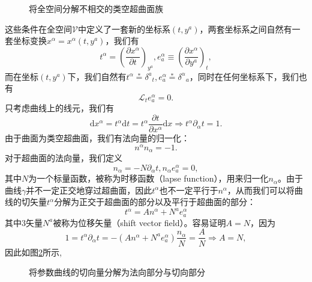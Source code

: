 \documentclass[hyperref, UTF8, a4paper]{ctexart}
\begin{document}
\begin{figure}
	\centering
	
	\caption{将全空间分解不相交的类空超曲面族}
	\label{hypersurface decompositon}
\end{figure}

这些条件在全空间$\mathscr{V}$中定义了一套新的坐标系$(t,y^{a} )$，两套坐标系之间自然有一套坐标变换$x^{\alpha } =x^{\alpha } (t,y^{a} )$，我们有
\begin{equation*}
	t^{\alpha } =\left(\frac{\partial x^{\alpha }}{\partial t}\right)_{y^{a}} ,e_{a}^{\alpha } \equiv \left(\frac{\partial x^{\alpha }}{\partial y^{a}}\right)_{t} ,
\end{equation*}
而在坐标$(t,y^{a} )$下，我们自然有$t^{\alpha }\stackrel{*}{=} \delta ^{a}{}_{t} ,e_{a}^{\alpha }\stackrel{*}{=} \delta ^{\alpha }{}_{a}$，同时在任何坐标系下，我们也有
\begin{equation*}
	\mathcal{L}_{t} e_{a}^{\alpha } =0.
\end{equation*}
只考虑曲线上的线元，我们有
\begin{equation*}
	\mathrm{d} x^{\alpha } =t^{\alpha }\mathrm{d} t=t^{\alpha }\frac{\partial t}{\partial x^{\alpha }}\mathrm{d} x\Rightarrow t^{\alpha } \partial _{\alpha } t=1.
\end{equation*}
由于曲面为类空超曲面，我们有法向量的归一化：
\begin{equation*}
	n^{\alpha } n_{\alpha } =-1.
\end{equation*}
对于超曲面的法向量，我们定义
\begin{equation*}
	n_{\alpha } =-N\partial _{\alpha } t,n_{\alpha } e_{a}^{\alpha } =0,
\end{equation*}
其中$N$为一个标量函数，被称为时移函数（lapse function），用来归一化$n_{\alpha }$。由于曲线$\gamma $并不一定正交地穿过超曲面，因此$t^{\alpha }$也不一定平行于$n^{\alpha }$，从而我们可以将曲线的切矢量$t^{\alpha }$分解为正交于超曲面的部分以及平行于超曲面的部分：
\begin{equation*}
	t^{\alpha } =An^{\alpha } +N^{a} e_{a}^{\alpha }
\end{equation*}
其中3矢量$N^{a}$被称为位移矢量（shift vector field）。容易证明$A=N$，因为
\begin{equation*}
	1=t^{\alpha } \partial _{\alpha } t=-(An^{\alpha } +N^{a} e_{a}^{\alpha } )\frac{n_{\alpha }}{N} =\frac{A}{N} \Rightarrow A=N,
\end{equation*}
因此如图\ref{lapse function}所示,

\begin{figure}
	\centering
	
	\caption{将参数曲线的切向量分解为法向部分与切向部分}
	\label{lapse function}
\end{figure}
\end{document}
